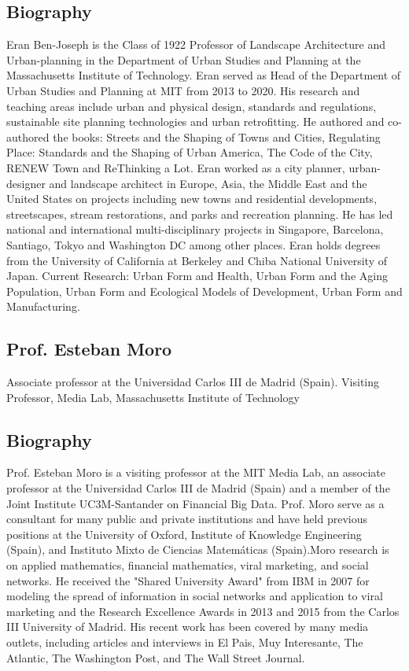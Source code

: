 \subsection*{Biography}
{
    Eran Ben-Joseph is the Class of 1922 Professor of Landscape Architecture and Urban-planning in the Department of Urban Studies and Planning at the Massachusetts Institute of Technology. Eran served as Head of the Department of Urban Studies and Planning at MIT from 2013 to 2020. His research and teaching areas include urban and physical design, standards and regulations, sustainable site planning technologies and urban retrofitting. He authored and co-authored the books: Streets and the Shaping of Towns and Cities, Regulating Place: Standards and the Shaping of Urban America, The Code of the City, RENEW Town and ReThinking a Lot. Eran worked as a city planner, urban-designer and landscape architect in Europe, Asia, the Middle East and the United States on projects including new towns and residential developments, streetscapes, stream restorations, and parks and recreation planning. He has led national and international multi-disciplinary projects in Singapore, Barcelona, Santiago, Tokyo and Washington DC among other places. Eran holds degrees from the University of California at Berkeley and Chiba National University of Japan. Current Research: Urban Form and Health, Urban Form and the Aging Population, Urban Form and Ecological Models of Development, Urban Form and Manufacturing.
}



\subsection*{Prof. Esteban Moro}

{
    Associate professor at the Universidad Carlos III de Madrid (Spain).
    Visiting Professor, Media Lab, Massachusetts Institute of Technology
}
% 
\subsection*{Biography}
% 
{
    Prof. Esteban Moro is a visiting professor at the MIT Media Lab, an associate professor at the Universidad Carlos III de Madrid (Spain) and a member of the Joint Institute UC3M-Santander on Financial Big Data. Prof. Moro serve as a consultant for many public and private institutions and have held previous positions at the University of Oxford, Institute of Knowledge Engineering (Spain), and Instituto Mixto de Ciencias Matemáticas (Spain).Moro research is on applied mathematics, financial mathematics, viral marketing, and social networks. He received the "Shared University Award" from IBM in 2007 for modeling the spread of information in social networks and application to viral marketing and the Research Excellence Awards in 2013 and 2015 from the Carlos III University of Madrid. His recent work has been covered by many media outlets, including articles and interviews in El Pais, Muy Interesante, The Atlantic, The Washington Post, and The Wall Street Journal.
}
